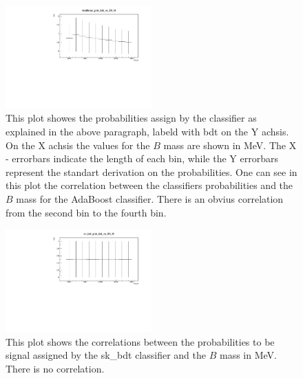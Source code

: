 \documentclass[english]{uzhpub}
\begin{document}

 \begin{figure}[H]
  \centering
  \includegraphics[width=0.5\textwidth]{plots/AdaBoost_plot_bdt_vs_B0_M}
  \caption{This plot showes the probabilities assign by the classifier as explained in the above paragraph, labeld with bdt on the Y achsis. On the X achsis the values for the $B$ mass are shown in MeV. The X - errorbars indicate the length of each bin, while the Y errorbars represent the standart derivation on the probabilities. One can see in this plot the correlation between the classifiers probabilities and the $B$ mass for the AdaBoost classifier. There is an obvius correlation from the second bin to the fourth bin.}
  \label{fig:AdaB0M}
 \end{figure}

 \begin{figure}[H]
  \centering
  \includegraphics[width=0.5\textwidth]{plots/sk_bdt_plot_bdt_vs_B0_M}
  \caption{This plot shows the correlations between the probabilities to be signal assigned by the sk\_bdt classifier and the $B$ mass in MeV. There is no correlation.}
  \label{fig:skbdtB0M}
 \end{figure}
\end{document}
